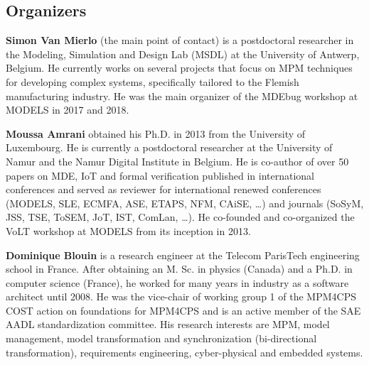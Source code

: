 \subsection{Organizers}
\noindent
\textbf{Simon Van Mierlo} (the main point of contact) is a postdoctoral researcher in the Modeling, Simulation and Design Lab (MSDL) at the University of Antwerp, Belgium.
He currently works on several projects that focus on MPM techniques for developing complex systems, specifically tailored to the Flemish manufacturing industry.
He was the main organizer of the MDEbug workshop at MODELS in 2017 and 2018.

\noindent
\textbf{Moussa Amrani} obtained his Ph.D. in 2013 from the University of Luxembourg. He is currently a postdoctoral researcher at the University of Namur and the Namur Digital Institute in Belgium. 
He is co-author of over 50 papers on MDE, IoT and formal verification published in international conferences and served as reviewer for international renewed conferences (MODELS, SLE, ECMFA, ASE, ETAPS, NFM, CAiSE, \ldots) and journals (SoSyM, JSS, TSE, ToSEM, JoT, IST, ComLan, \ldots). He co-founded and co-organized the VoLT workshop at MODELS from its inception in 2013. 

\noindent
\textbf{Dominique Blouin} is a research engineer at the Telecom ParisTech engineering school in France. 
After obtaining an M. Sc. in physics (Canada) and a Ph.D. in computer science (France), he worked for many years in industry as a software architect until 2008. He was the vice-chair of working group 1 of the MPM4CPS COST action on foundations for MPM4CPS and is an active member of the SAE AADL standardization committee. 
His research interests are MPM, model management, model transformation and synchronization (bi-directional transformation), requirements engineering, cyber-physical and embedded systems.


